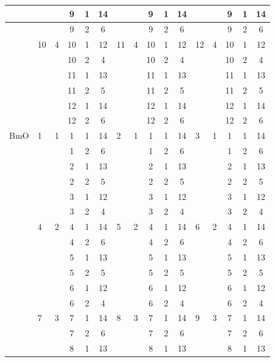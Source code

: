 \documentclass{cmspaper}
\begin{document}
\begin{table}[htb]
\begin{center}
\begin{tabular}{l|l|cccc|l|cccc|l|cccc}
    &   &   & 9 & 1 & 14 &    &   & 9 & 1& 14 &   &   & 9 & 1& 14 \\ \hline
    &   &   & 9 & 2 &  6 &    &   & 9 & 2&  6 &   &   & 9 & 2&  6 \\ \hline
    & 10& 4 & 10 & 1 & 12 & 11& 4 & 10& 1& 12 & 12& 4 & 10 & 1& 12 \\ \hline
    &   &   & 10 & 2 &  4 &    &   & 10 & 2&  4 &   &   & 10 & 2&  4 \\ \hline
    &   &   & 11 & 1 & 13 &    &   & 11 & 1& 13 &   &   & 11 & 1& 13 \\ \hline
    &   &   & 11 & 2 &  5 &    &   & 11 & 2&  5 &   &   & 11 & 2&  5 \\ \hline
    &   &   & 12 & 1 & 14 &    &   & 12 & 1& 14 &   &   & 12 & 1& 14 \\ \hline
    &   &   & 12 & 2 &  6 &    &   & 12 & 2&  6 &   &   & 12 & 2&  6 \\ \hline
\hline
BmO & 1 & 1 & 1 & 1 & 14 & 2  & 1 & 1 & 1& 14 & 3 & 1 & 1 & 1& 14 \\ \hline
    &   &   & 1 & 2 &  6 &    &   & 1 & 2&  6 &   &   & 1 & 2&  6 \\ \hline
    &   &   & 2 & 1 & 13 &    &   & 2 & 1& 13 &   &   & 2 & 1& 13 \\ \hline
    &   &   & 2 & 2 &  5 &    &   & 2 & 2&  5 &   &   & 2 & 2&  5 \\ \hline
    &   &   & 3 & 1 & 12 &    &   & 3 & 1& 12 &   &   & 3 & 1& 12 \\ \hline
    &   &   & 3 & 2 &  4 &    &   & 3 & 2&  4 &   &   & 3 & 2&  4 \\ \hline
    & 4 & 2 & 4 & 1 & 14 & 5  & 2 & 4 & 1& 14 & 6 & 2 & 4 & 1& 14 \\ \hline
    &   &   & 4 & 2 &  6 &    &   & 4 & 2&  6 &   &   & 4 & 2&  6 \\ \hline
    &   &   & 5 & 1 & 13 &    &   & 5 & 1& 13 &   &   & 5 & 1& 13 \\ \hline
    &   &   & 5 & 2 &  5 &    &   & 5 & 2&  5 &   &   & 5 & 2&  5 \\ \hline
    &   &   & 6 & 1 & 12 &    &   & 6 & 1& 12 &   &   & 6 & 1& 12 \\ \hline
    &   &   & 6 & 2 &  4 &    &   & 6 & 2&  4 &   &   & 6 & 2&  4 \\ \hline
    & 7 & 3 & 7 & 1 & 14 & 8  & 3 & 7 & 1& 14 & 9 & 3 & 7 & 1& 14 \\ \hline
    &   &   & 7 & 2 &  6 &    &   & 7 & 2&  6 &   &   & 7 & 2&  6 \\ \hline
    &   &   & 8 & 1 & 13 &    &   & 8 & 1& 13 &   &   & 8 & 1& 13 \\ \hline

\end{tabular}
\end{center}
\end{table}
\end{document}
